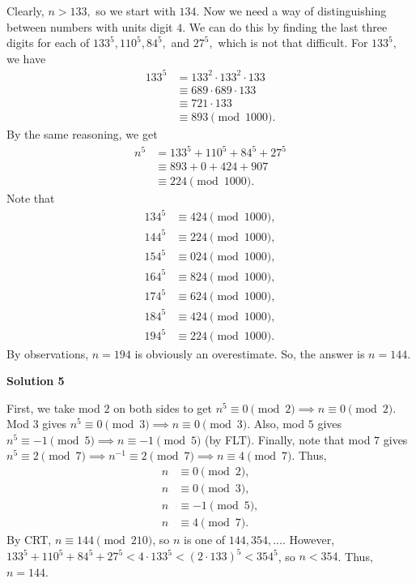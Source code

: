 \begin{enumerate}
 Clearly, $n>133,$ so we start with $134.$ Now we need a way of distinguishing between numbers with units digit $4.$ We can do this by finding the last three digits for each of $133^5, 110^5, 84^5,$ and $27^5,$ which is not that difficult. For $133^5,$ we have
 \begin{align*} 133^5&=133^2\cdot133^2\cdot133 \\ &\equiv689\cdot689\cdot133 \\ &\equiv721\cdot133 \\ &\equiv893\pmod{1000}. \end{align*}
By the same reasoning, we get
 \begin{align*} n^5&=133^5+110^5+84^5+27^5 \\ &\equiv893+0+424+907 \\ &\equiv224\pmod{1000}. \end{align*}
Note that
 \begin{align*} 134^5&\equiv424\pmod{1000}, \\ 144^5&\equiv224\pmod{1000}, \\ 154^5&\equiv024\pmod{1000}, \\ 164^5&\equiv824\pmod{1000}, \\ 174^5&\equiv624\pmod{1000}, \\ 184^5&\equiv424\pmod{1000}, \\ 194^5&\equiv224\pmod{1000}. \end{align*}
By observations, $n=194$ is obviously an overestimate. So, the answer is $n=\boxed{144}.$




\textbf{Solution 5}

First, we take mod $2$ on both sides to get $n^5\equiv 0\pmod{2}\implies n\equiv 0\pmod{2}$. Mod $3$ gives $n^5\equiv 0\pmod{3}\implies n\equiv 0\pmod{3}$. Also, mod $5$ gives $n^5\equiv -1\pmod{5}\implies n\equiv -1\pmod{5}$ (by FLT). Finally, note that mod $7$ gives $n^5\equiv 2\pmod{7}\implies n^{-1}\equiv 2\pmod{7}\implies n\equiv 4\pmod{7}$. Thus,
 \begin{align*} n&\equiv 0\pmod{2}, \\ n&\equiv 0\pmod{3}, \\ n&\equiv -1\pmod{5}, \\ n&\equiv 4\pmod{7}. \end{align*}
By CRT, $n\equiv 144\pmod{210}$, so $n$ is one of $144, 354, ...$. However, $133^5 + 110^5 + 84^5 + 27^5 < 4\cdot 133^5 < (2\cdot 133)^5 < 354^5$, so $n < 354$. Thus, $n = \boxed{144}$.


\end{enumerate}
